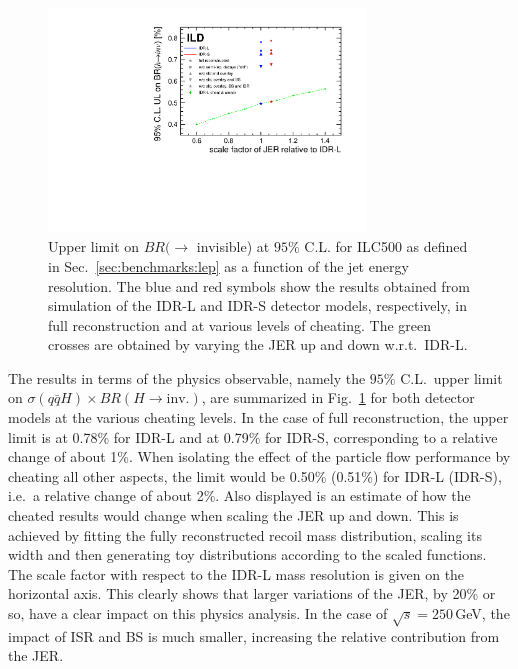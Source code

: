\begin{figure}[htbp]
\begin{center}
 \includegraphics[width=0.75\textwidth]{Performance/fig/performance_plot.pdf}
\end{center}
\caption{Upper limit on $BR( \to $ invisible) at $95\%$ C.L. for ILC500 as defined in Sec.~\ref{sec:benchmarks:lep} as a function of the jet energy resolution. The blue and red symbols show the results obtained from simulation of the IDR-L and IDR-S detector models, respectively, in full reconstruction and at various levels of cheating. The green crosses are obtained by varying the JER up and down w.r.t.\ IDR-L.
}
\label{fig:Hinv:BRlimit}
\end{figure}

The results in terms of the physics observable, namely the $95\%$ C.L.\ upper limit on $\sigma(q\bar{q} H)\times BR(H \to \mbox{inv.})$, are summarized in Fig.~\ref{fig:Hinv:BRlimit} for both detector models at the various cheating levels. In the case of full reconstruction, the upper limit is at 0.78\%  for IDR-L  and at  0.79\%  for IDR-S, corresponding to a relative change of about 1\%. When isolating the effect of the particle flow performance by cheating all other aspects, the limit would be 0.50\% (0.51\%) for IDR-L (IDR-S), i.e.\ a relative change of about 2\%. Also displayed is an estimate of how
the cheated results would change when scaling the JER up and down. This is achieved by fitting the fully reconstructed recoil mass distribution, scaling its width and then generating toy distributions according to the scaled functions. The scale factor with respect to the IDR-L mass resolution is given on the horizontal axis. This clearly shows that
larger variations of the JER, by 20\% or so, have a clear impact on this physics analysis.
In the case of $\sqrt{s}=250$\,GeV, the impact of ISR and BS is much smaller, increasing the relative contribution from the JER.




